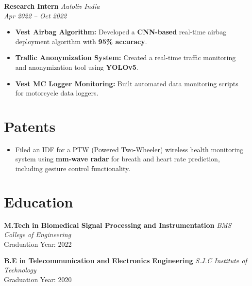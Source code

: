 \documentclass[a4paper,10pt]{article}
\begin{document}
\vspace{0.2cm}

\textbf{Research Intern} \hfill \textit{Autoliv India} \\
\textit{Apr 2022 – Oct 2022}
\begin{itemize}[leftmargin=1.5em]
    \item \textbf{Vest Airbag Algorithm:} Developed a \textbf{CNN-based} real-time airbag deployment algorithm with \textbf{95\% accuracy}.
    \item \textbf{Traffic Anonymization System:} Created a real-time traffic monitoring and anonymization tool using \textbf{YOLOv5}.
    \item \textbf{Vest MC Logger Monitoring:} Built automated data monitoring scripts for motorcycle data loggers.
\end{itemize}

\vspace{0.3cm}

\section*{Patents}
\begin{itemize}[leftmargin=1.5em]
    \item Filed an IDF for a PTW (Powered Two-Wheeler) wireless health monitoring system using \textbf{mm-wave radar} for breath and heart rate prediction, including gesture control functionality.
\end{itemize}

\vspace{0.3cm}

\section*{Education}

\textbf{M.Tech in Biomedical Signal Processing and Instrumentation} \hfill \textit{BMS College of Engineering} \\
Graduation Year: 2022

\textbf{B.E in Telecommunication and Electronics Engineering} \hfill \textit{S.J.C Institute of Technology} \\
Graduation Year: 2020
\end{document}
